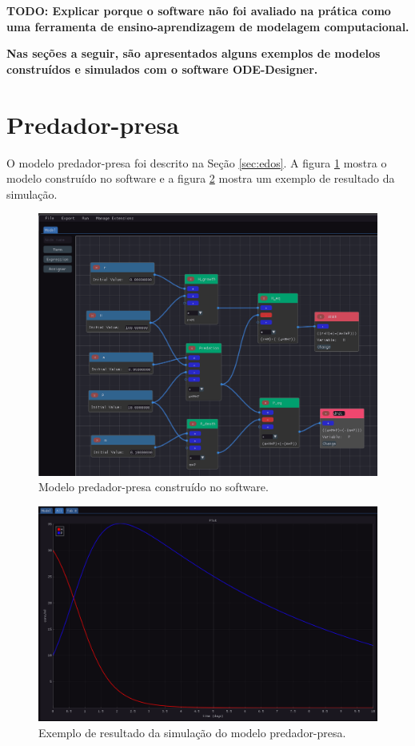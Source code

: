\documentclass[
	12pt,				%
	openright,			%
	oneside,			%
	a4paper,			%
	main=brazil,
	english,			%
	]{ufsj-abntex2}
\begin{document}
\textbf{TODO: Explicar porque o software não foi avaliado na prática como uma ferramenta de ensino-aprendizagem de modelagem computacional.}

\textbf{Nas seções a seguir, são apresentados alguns exemplos de modelos construídos e simulados com o software ODE-Designer. }

\section{Predador-presa}

O modelo predador-presa foi descrito na Seção \ref{sec:edos}. A figura \ref{fig:predador-presa} mostra o modelo construído no software e a figura \ref{fig:resultado-predador-presa} mostra um exemplo de resultado da simulação. 

\begin{figure}[h]
    \centering
    \includegraphics[width=\textwidth]{imgs/modelos/predador-presa.png} 
    \caption{Modelo predador-presa construído no software.}
    \label{fig:predador-presa}
\end{figure}

\begin{figure}[h]
    \centering
    \includegraphics[width=\textwidth]{imgs/modelos/resultado-predador-presa.png} 
    \caption{Exemplo de resultado da simulação do modelo predador-presa.}
    \label{fig:resultado-predador-presa}
\end{figure}
\end{document}

